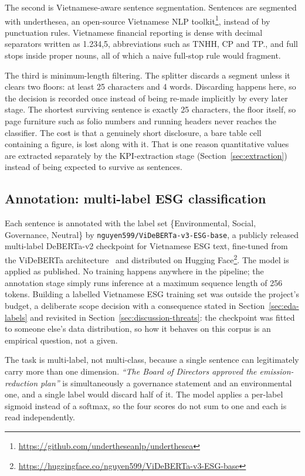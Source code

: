 \documentclass[fontsize=12pt,oneside,headings=small]{scrreprt}
\begin{document}
The second is Vietnamese-aware sentence segmentation. Sentences are segmented with
underthesea, an open-source Vietnamese NLP toolkit\footnote{\url{https://github.com/undertheseanlp/underthesea}},
instead of by punctuation rules. Vietnamese financial reporting is dense
with decimal separators written as 1.234,5, abbreviations such as TNHH, CP
and TP., and full stops inside proper nouns, all of which a naive full-stop
rule would fragment.

The third is minimum-length filtering. The splitter discards a segment unless it
clears two floors: at least 25 characters and 4 words.
Discarding happens here, so the decision is recorded
once instead of being re-made implicitly by every later stage. The shortest
surviving sentence is exactly 25 characters, the floor itself, so page
furniture such as folio numbers and running headers never reaches the
classifier. The cost is that a genuinely short disclosure, a bare table
cell containing a figure, is lost along with it. That is one reason quantitative values
are extracted separately by the KPI-extraction stage (Section~\ref{sec:extraction})
instead of being expected to survive as sentences.
\subsection{Annotation: multi-label ESG classification}
\label{sec:annotation}

Each sentence is annotated with the label set \{Environmental, Social,
Governance, Neutral\} by \texttt{nguyen599/ViDeBERTa-v3-ESG-base}, a publicly
released multi-label DeBERTa-v2 checkpoint for Vietnamese ESG text, fine-tuned
from the ViDeBERTa architecture~\cite{tran2023videberta} and distributed on
Hugging Face\footnote{\url{https://huggingface.co/nguyen599/ViDeBERTa-v3-ESG-base}}.
The model is applied as published. No training
happens anywhere in the pipeline; the annotation stage simply runs
inference at a maximum sequence length of 256 tokens. Building a labelled
Vietnamese ESG training set was outside the project's budget, a deliberate
scope decision with a consequence stated in Section~\ref{sec:eda-labels} and
revisited in Section~\ref{sec:discussion-threats}: the checkpoint was fitted to
someone else's data distribution, so how it behaves on this corpus is an
empirical question, not a given.

The task is multi-label, not multi-class, because a single sentence
can legitimately carry more than one dimension. \textit{``The Board of
Directors approved the emission-reduction plan''} is simultaneously a
governance statement and an environmental one, and a single label would
discard half of it. The model applies a per-label sigmoid instead of a
softmax, so the four scores do not sum to one and each is read independently.
\end{document}
